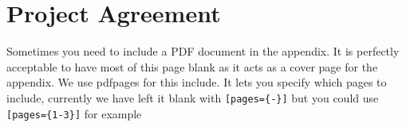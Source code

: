 \chapter{Project Agreement}
\label{app:agreement}

Sometimes you need to include a PDF document in the appendix.  It is perfectly acceptable to have most of this page blank as it acts as a cover page for the appendix. We use pdfpages for this include.  It lets you specify which pages to include, currently we have left it blank with \lstinline|[pages={-}]| but you could use \lstinline|[pages={1-3}]| for example 


